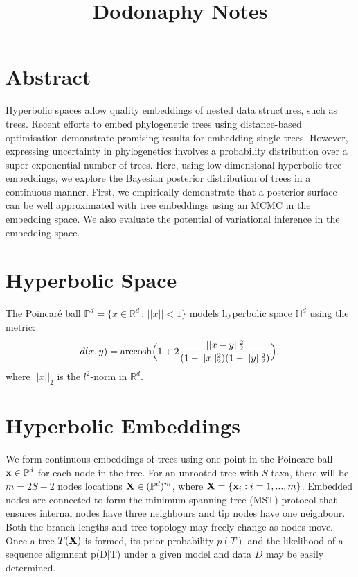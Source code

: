\documentclass[11pt]{article}
\title{Dodonaphy Notes}
\begin{document}
\maketitle
\section{Abstract}
Hyperbolic spaces allow quality embeddings of nested data structures, such as trees.
Recent efforts to embed phylogenetic trees using distance-based optimisation demonstrate promising results for embedding single trees.
However, expressing uncertainty in phylogenetics involves a probability distribution over a super-exponential number of trees.
Here, using low dimensional hyperbolic tree embeddings, we explore the Bayesian posterior distribution of trees in a continuous manner.
First, we empirically demonstrate that a posterior surface can be well approximated with tree embeddings using an MCMC in the embedding space.
We also evaluate the potential of variational inference in the embedding space.

\section{Hyperbolic Space}
The Poincaré ball $\mathbb{P}^{d} = \{x\in \mathbb{R}^{d} \,:\, ||x||<1\}$ models hyperbolic space $\mathbb{H}^{d}$ using the metric:
\begin{equation*}\label{eq:poin_dist}
d(x,y) = \textnormal{arccosh}\Big(1 + 2 \frac{||x-y||_{2}^{2}}{ (1-||x||_{2}^{2}) (1-||y||_{2}^{2})}\Big),
\end{equation*}
where $||x||_{2}$ is the $l^{2}$-norm in $\mathbb{R}^{d}$.

\section{Hyperbolic Embeddings}
We form continuous embeddings of trees using one point in the Poincare ball $\bold{x} \in \mathbb{P}^{d}$ for each node in the tree.
For an unrooted tree with $S$ taxa, there will be $m=2S - 2$ nodes locations $\bold{X} \in(\mathbb{P}^{d})^{m}$, where $\bold{X} = \{\bold{x}_{i}: i=1, ..., m\}$.
Embedded nodes are connected to form the minimum spanning tree (MST) protocol that ensures internal nodes have three neighbours and tip nodes have one neighbour.
Both the branch lengths and tree topology may freely change as nodes move.
Once a tree $T(\bold{X})$ is formed, its prior probability $p(T)$ and the likelihood of a sequence aligmnent p(D\big|T) under a given model and data $D$ may be easily determined.
\end{document}
